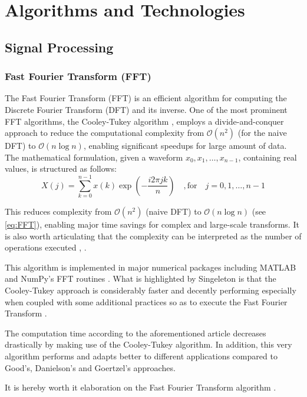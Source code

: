\section{Algorithms and Technologies}
\subsection{Signal Processing}
\subsubsection{Fast Fourier Transform (FFT)}
{
The Fast Fourier Transform (FFT) is an efficient algorithm for computing the Discrete Fourier Transform (DFT) and its inverse. One of the most prominent FFT algorithms, the Cooley-Tukey algorithm \cite{CooleyTukey1965}, employs a divide-and-conquer approach to reduce the computational complexity from $\mathcal{O}(n^2)$ (for the naive DFT) to $\mathcal{O}(n \log n)$, enabling significant speedups for large amount of data. The mathematical formulation, given a waveform $x_0, x_1, \dots, x_{n-1}$, containing real values, is structured as follows:
\begin{equation}
	X(j) = \sum_{k=0}^{n-1} x(k) \exp\left( - \frac{i2\pi jk}{n} \right) \quad, \text{for} \quad j = 0,1,\dots,n-1
	\label{eq:FFT}
\end{equation}

This reduces complexity from $\mathcal{O}(n^2)$ (naive DFT) to $\mathcal{O}(n \log n)$ (see \eqref{eq:FFT}), enabling major time savings for complex and large-scale transforms. It is also worth articulating that the complexity can be interpreted as the number of operations executed \cite{CooleyTukey1965}, \cite{Singeleton1967}. 

This algorithm is implemented in major numerical packages including MATLAB and NumPy's FFT routines \cite{FFT}. What is highlighted  by Singeleton is that the Cooley-Tukey approach is considerably faster and decently performing especially when coupled with some additional practices so as to execute the Fast Fourier Transform \cite{Singeleton1967}. 

The computation time according to the aforementioned article decreases drastically by making use of the Cooley-Tukey algorithm. In addition, this very algorithm performs and adapts better to different applications compared to Good's, Danielson's and Goertzel's approaches.

It is hereby worth it elaboration on the Fast Fourier Transform algorithm \cite{CooleyTukey1965}.
}

